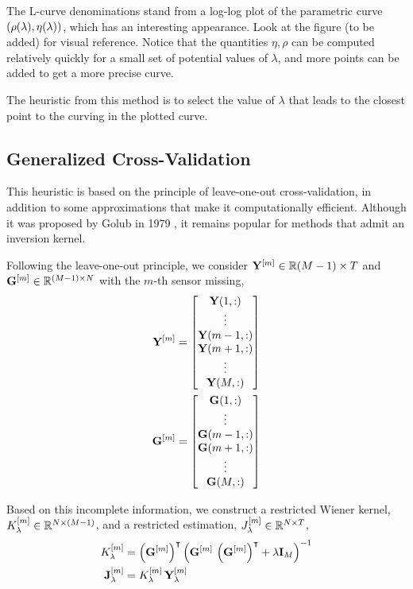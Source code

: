 The L-curve denominations stand from a log-log plot of the parametric curve $\left( \rho(\lambda), \eta(\lambda)  \right)$, which has an interesting appearance.
%
Look at the figure (to be added) for visual reference.
%
Notice that the quantities $\eta, \rho$ can be computed relatively quickly for a small set of potential values of $\lambda$, and more points can be added to get a more precise curve.

The heuristic from this method is to select the value of $\lambda$ that leads to the closest point to the curving in the plotted curve.


\subsection{Generalized Cross-Validation}

This heuristic is based on the principle of leave-one-out cross-validation, in addition to some approximations that make it computationally efficient. 
%
Although it was proposed by Golub in 1979 \cite{GCV_Golub}, it remains popular for methods that admit an inversion kernel.

Following the leave-one-out principle, we consider $\mathbf{Y}^{[m]}\in\mathbb{R}{(M-1)\times T}$ and $\mathbf{G}^{[m]} \in \mathbb{R}^{(M-1)\times N}$ with the $m$-th sensor missing,
\begin{align}
\mathbf{Y}^{[m]} &=
\begin{bmatrix}
\mathbf{Y}(1,:) \\
\vdots \\
\mathbf{Y}(m-1,:) \\
\mathbf{Y}(m+1,:) \\
\vdots \\
\mathbf{Y}(M,:) 
\end{bmatrix}
\\
\mathbf{G}^{[m]} &=
\begin{bmatrix}
\mathbf{G}(1,:) \\
\vdots \\
\mathbf{G}(m-1,:) \\
\mathbf{G}(m+1,:) \\
\vdots \\
\mathbf{G}(M,:) 
\end{bmatrix}
\end{align}

Based on this incomplete information, we construct a restricted Wiener kernel, $K_\lambda^{[m]} \in \mathbb{R}^{N\times(M-1)}$, and a restricted estimation, $J_\lambda^{[m]} \in \mathbb{R}^{N\times T}$,
\begin{align}
K_\lambda^{[m]}
&=
\left( \mathbf{G}^{[m]} \right)^\intercal\left(  \mathbf{G}^{[m]}\, \left( \mathbf{G}^{[m]} \right)^\intercal + \lambda\mathbf{I}_M  \right)^{-1}
\\
\mathbf{J}_\lambda^{[m]}
&=
K_\lambda^{[m]}\, \mathbf{Y}_\lambda^{[m]}
\end{align}

